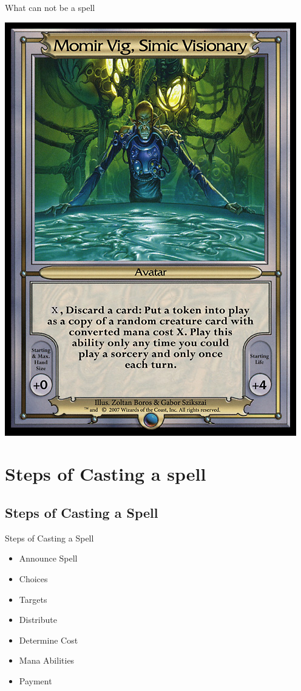 \documentclass[utf8x]{beamer}
\begin{document}
\begin{frame}{What can not be a spell}
\begin{itemize}
{{        \includegraphics[scale=.21]{Momir}}}
      \end{itemize}
    \end{frame}

\section{Steps of Casting a spell}
  \subsection*{Steps of Casting a Spell}
  
    \begin{frame}{Steps of Casting a Spell}
      \begin{itemize}
        \item Announce Spell
        \item Choices
        \item Targets
        \item Distribute
        \item Determine Cost
        \item Mana Abilities
        \item Payment
      \end{itemize}
    \end{frame}
\end{document}
